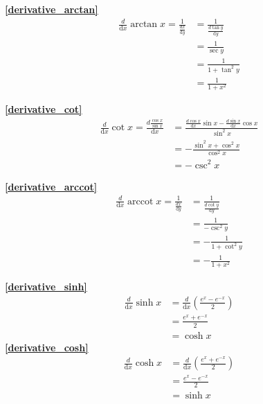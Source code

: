 \textbf{\large \ref{derivative_arctan}}
\begin{displaymath}
    \begin{split}
        \frac{d}{\mathrm{d}{x}}\arctan x=\frac{1}{\frac{dx}{\mathrm{d}{y}}}&=\frac{1}{\frac{d\tan y}{\mathrm{d}{y}}}\\
        &=\frac{1}{\sec y}\\
        &=\frac{1}{1+\tan^2 y}\\
        &=\frac{1}{1+x^2}
    \end{split}
\end{displaymath}

\textbf{\large \ref{derivative_cot}}
\begin{displaymath}
    \begin{split}
        \frac{d}{\mathrm{d}{x}}\cot x=\frac{d\frac{\cos x}{\sin x}}{\mathrm{d}{x}}&=\frac{\frac{d\cos x}{\mathrm{d}{x}}\sin x-\frac{d\sin x}{\mathrm{d}{x}}\cos x}{\sin^2x}\\
        &=-\frac{\sin^2 x+\cos^2 x}{\cos^2x}\\
        &=-\csc^2 x
    \end{split}
\end{displaymath}

\textbf{\large \ref{derivative_arccot}}
\begin{displaymath}
    \begin{split}
        \frac{d}{\mathrm{d}{x}}\operatorname{arccot}{x}=\frac{1}{\frac{dx}{\mathrm{d}{y}}}&=\frac{1}{\frac{d\cot y}{\mathrm{d}{y}}}\\
        &=\frac{1}{-\csc^2 y}\\
        &=-\frac{1}{1+\cot^2 y}\\
        &=-\frac{1}{1+x^2}
    \end{split}
\end{displaymath}

\textbf{\large \ref{derivative_sinh}}
\begin{displaymath}
    \begin{split}
        \frac{d}{\mathrm{d}{x}}\sinh x&=\frac{d}{\mathrm{d}{x}}\left(\frac{e^x-e^{-x}}{2}\right)\\
                                    &=\frac{e^x+e^{-x}}{2}\\
                                    &=\cosh x
    \end{split}
\end{displaymath}
\textbf{\large \ref{derivative_cosh}}
\begin{displaymath}
    \begin{split}
        \frac{d}{\mathrm{d}{x}}\cosh x&=\frac{d}{\mathrm{d}{x}}\left(\frac{e^x+e^{-x}}{2}\right)\\
                                    &=\frac{e^x-e^{-x}}{2}\\
                                    &=\sinh x
    \end{split}
\end{displaymath}

